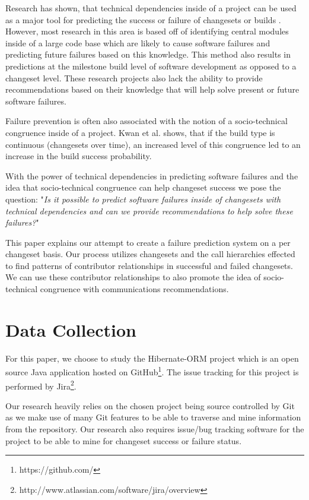 \documentclass[conference]{IEEEtran}
\begin{document}
Research has shown, that technical dependencies inside of a project can be used as a major
tool for predicting the success or failure of changesets or builds \cite{Pinzger:2008:DNP}
\cite{Zimmermann:2008:PDU}. However, most research in this area is based off of identifying
central modules inside of a large code base which are likely to cause software failures and 
predicting future failures based on this knowledge. This method also results in predictions 
at the milestone build level of software development as opposed to a changeset level.
These research projects also lack the ability to provide recommendations based on their 
knowledge that will help solve present or future software failures.

Failure prevention is often also associated with the notion of a socio-technical 
congruence inside of a project\cite{Conway:1968}. Kwan et al. \cite{Kwan:2011:SD} shows, 
that if the build type is continuous (changesets over time), an increased level of this
congruence led to an increase in the build success probability.

With the power of technical dependencies in predicting software failures and the idea
that socio-technical congruence can help changeset success we pose the question: 
"\textit{Is it possible to predict software failures inside of changesets with technical
dependencies and can we provide recommendations to help solve these failures?}"

This paper explains our attempt to create a failure prediction system on a per changeset basis.
Our process utilizes changesets and the call hierarchies effected  to find patterns of contributor 
relationships in successful and failed changesets.  We can use these contributor relationships 
to also promote the idea of socio-technical congruence with communications recommendations.


\section{Data Collection}
For this paper, we choose to study the Hibernate-ORM project which is an open source Java 
application hosted on GitHub\footnote{https://github.com/}. 
The issue tracking for this project is performed by Jira\footnote{http://www.atlassian.com/software/jira/overview}.

Our research heavily relies on the chosen project being source controlled by Git as we make use of many
Git features to be able to traverse and mine information from the repository. Our research also
requires issue/bug tracking software for the project to be able to mine for changeset success or
failure status.
\end{document}
